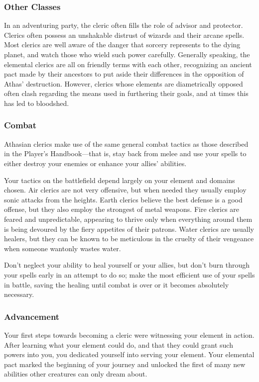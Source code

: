 \subsubsection{Other Classes}
In an adventuring party, the cleric often fills the role of advisor and protector. Clerics often possess an unshakable distrust of wizards and their arcane spells. Most clerics are well aware of the danger that sorcery represents to the dying planet, and watch those who wield such power carefully. Generally speaking, the elemental clerics are all on friendly terms with each other, recognizing an ancient pact made by their ancestors to put aside their differences in the opposition of Athas' destruction. However, clerics whose elements are diametrically opposed often clash regarding the means used in furthering their goals, and at times this has led to bloodshed.

\subsubsection{Combat}
Athasian clerics make use of the same general combat tactics as those described in the Player's Handbook---that is, stay back from melee and use your spells to either destroy your enemies or enhance your allies' abilities.

Your tactics on the battlefield depend largely on your element and domains chosen. Air clerics are not very offensive, but when needed they usually employ sonic attacks from the heights. Earth clerics believe the best defense is a good offense, but they also employ the strongest of metal weapons. Fire clerics are feared and unpredictable, appearing to thrive only when everything around them is being devoured by the fiery appetites of their patrons. Water clerics are usually healers, but they can be known to be meticulous in the cruelty of their vengeance when someone wantonly wastes water.

Don't neglect your ability to heal yourself or your allies, but don't burn through your spells early in an attempt to do so; make the most efficient use of your spells in battle, saving the healing until combat is over or it becomes absolutely necessary.

\subsubsection{Advancement}
Your first steps towards becoming a cleric were witnessing your element in action. After learning what your element could do, and that they could grant such powers into you, you dedicated yourself into serving your element. Your elemental pact marked the beginning of your journey and unlocked the first of many new abilities other creatures can only dream about.

